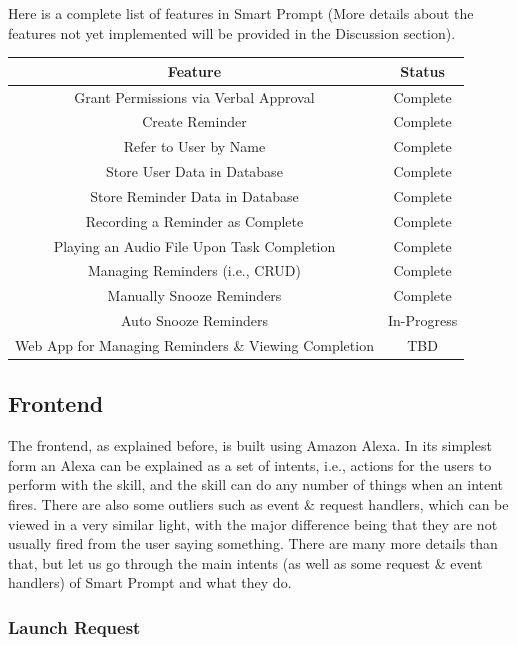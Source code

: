 \documentclass[11pt, oneside]{article}
\begin{document}
Here is a complete list of features in Smart Prompt (More details about the features not yet implemented will be provided in the Discussion section).
\begin{center}
\begin{tabular}{| c | c |}
 \hline
 Feature & Status \\ [0.5ex] 
 \hline\hline
 Grant Permissions via Verbal Approval & Complete \\
 \hline
 Create Reminder & Complete \\
 \hline
 Refer to User by Name & Complete \\
 \hline
 Store User Data in Database & Complete \\
 \hline
 Store Reminder Data in Database & Complete \\
 \hline
 Recording a Reminder as Complete & Complete \\
 \hline
 Playing an Audio File Upon Task Completion & Complete \\
 \hline
 Managing Reminders (i.e., CRUD) & Complete \\
 \hline
 Manually Snooze Reminders & Complete \\
 \hline
 Auto Snooze Reminders & In-Progress \\
 \hline
 Web App for Managing Reminders \& Viewing Completion & TBD \\
 \hline
\end{tabular}
\end{center}

\subsection{Frontend}

The frontend, as explained before, is built using Amazon Alexa. 
In its simplest form an Alexa can be explained as a set of intents, i.e., actions for the users to perform with the skill, and the skill can do any number of things when an intent fires. 
There are also some outliers such as event \& request handlers, which can be viewed in a very similar light, with the major difference being that they are not usually fired from the user saying something. 
There are many more details than that, but let us go through the main intents (as well as some request \& event handlers) of Smart Prompt and what they do. 

\subsubsection{Launch Request}
\end{document}
